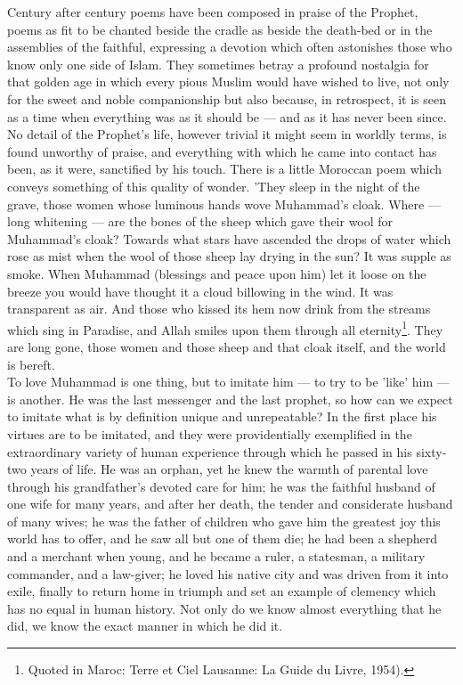 \documentclass[11pt, b5paper, twoside]{book}
\begin{document}
Century after century poems have been composed in praise of the Prophet, poems as fit to be chanted 
beside the cradle as beside the death-bed or in the assemblies of the faithful, expressing a devotion 
which often astonishes those who know only one side of Islam. They sometimes betray a profound 
nostalgia for that golden age in which every pious Muslim would have wished to live, not only for the 
sweet and noble companionship but also because, in retrospect, it is seen as a time when everything 
was as it should be --- and as it has never been since. No detail of the Prophet's life, however 
trivial it might seem in worldly terms, is found unworthy of praise, and everything with which he 
came into contact has been, as it were, sanctified by his touch. There is a little Moroccan poem 
which conveys something of this quality of wonder. 'They sleep in the night of the grave, those women 
whose luminous hands wove Muhammad's cloak. Where --- long whitening --- are the bones of the sheep which gave their wool for Muhammad's cloak? Towards what stars have ascended the drops of water which rose as mist when the wool of those sheep lay drying in the sun? It was supple as smoke. When Muhammad (blessings and peace upon him) let it loose on the breeze you would have thought it a cloud billowing in the wind. It was transparent as air. And those who kissed its hem now drink from the streams which sing in Paradise, and Allah smiles upon them through all eternity\footnote{Quoted in Maroc: Terre et Ciel Lausanne: La Guide du Livre, 1954).}. They are long gone, those women and those sheep and that cloak itself, and the world is bereft. \\

To love Muhammad is one thing, but to imitate him --- to try to be 'like' him --- is another. He was the 
last messenger and the last prophet, so how can we expect to imitate what is by definition unique and 
unrepeatable? In the first place his virtues are to be imitated, and they were providentially 
exemplified in the extraordinary variety of human experience through which he passed in his sixty-two 
years of life. He was an orphan, yet he knew the warmth of parental love through his grandfather's 
devoted care for him; he was the faithful husband of one wife for many years, and after her death, 
the tender and considerate husband of many wives; he was the father of children who gave him the 
greatest joy this world has to offer, and he saw all but one of them die; he had been a shepherd and 
a merchant when young, and he became a ruler, a statesman, a military commander, and a law-giver; he 
loved his native city and was driven from it into exile, finally to return home in triumph and set an 
example of clemency which has no equal in human history. Not only do we know almost everything that 
he did, we know the exact manner in which he did it. \\
\end{document}
